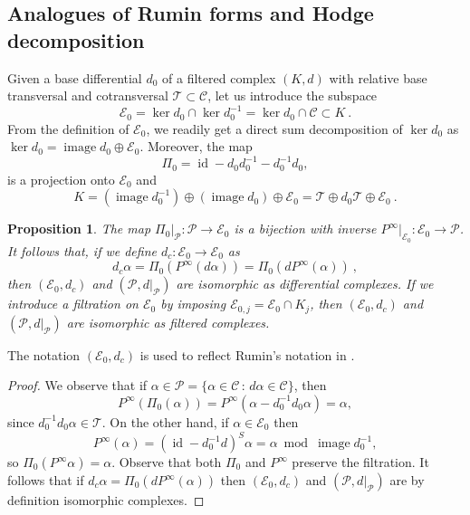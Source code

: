 \documentclass[10pt]{amsart}
\newcounter{dummy} \numberwithin{dummy}{section}
\newtheorem{proposition}[dummy]{Proposition}
\theoremstyle{remark}
\newcommand{\calP}{\mathcal{P}}
\newcommand{\calT}{\mathcal{T}}
\newcommand{\calC}{\mathcal{C}}
\newcommand{\calE}{\mathcal{E}}
\DeclareMathOperator{\id}{id}
\DeclareMathOperator{\image}{image}
\numberwithin{equation}{section}
\begin{document}
\subsection{Analogues of Rumin forms and Hodge decomposition}\label{subsection Rumin}
Given a base differential $d_0$ of a filtered complex $(K,d)$ with relative base transversal and cotransversal $\mathcal{T}\subset\mathcal{C}$, let us introduce the subspace
$$\calE_0 = \ker d_0 \cap \ker d_0^{-1}  = \ker d_0 \cap \calC \subset K\ .$$
From the definition of $\mathcal{E}_0$, we readily get a direct sum decomposition of $\ker d_0$ as  $\ker d_0 = \image d_0 \oplus \calE_0$. Moreover, the map 
\begin{equation} \label{Pi0operator} \Pi_{0} = \id - d_0d_0^{-1} - d_0^{-1}d_0,\end{equation}
is a projection onto $\calE_0$ and
$$K = (\image d_0^{-1}) \oplus (\image d_0) \oplus \calE_0 = \calT \oplus d_0 \calT \oplus \calE_0\ .$$
\begin{proposition}\label{prop 2.9}
The map $\Pi_0|_{\calP}: \calP \to \calE_0$ is a bijection with inverse $P^\infty|_{\calE_0}: \calE_0 \to \calP$. It follows that, if we define $d_c: \calE_0 \to \calE_0$ as
$$d_c \alpha = \Pi_0(P^\infty(d\alpha))=\Pi_0(dP^\infty(\alpha))\ , $$
then $(\calE_0, d_c)$ and $(\calP, d|_{\calP})$ are isomorphic as differential complexes. If we introduce a filtration on $\mathcal{E}_0$ by imposing $\calE_{0,j} = \calE_0 \cap K_j$, then $(\calE_0, d_c)$ and $(\calP, d|_{\calP})$ are isomorphic as filtered complexes.
\end{proposition}
The notation $(\calE_0, d_c)$ is used to reflect Rumin's notation in \cite{Rumin4}.

\begin{proof}
We observe that if $\alpha \in \calP = \{ \alpha \in \calC \, : \, d\alpha \in \calC\}$, then
$$P^\infty(\Pi_0(\alpha)) = P^\infty(\alpha - d^{-1}_0 d_0 \alpha) = \alpha,$$
since $d_0^{-1} d_0 \alpha \in \calT$. On the other hand, if $\alpha \in \calE_0$ then
$$P^\infty(\alpha) = (\id - d_0^{-1} d)^S \alpha = \alpha \bmod \image d_0^{-1},$$
so $\Pi_0(P^\infty \alpha) = \alpha$. Observe that both $\Pi_0$ and $P^\infty$ preserve the filtration. It follows that if $d_c \alpha = \Pi_0(d P^\infty(\alpha))$ then $(\calE_0, d_c)$ and $(\calP, d|_{\calP})$ are by definition isomorphic complexes.
\end{proof}
\end{document}
